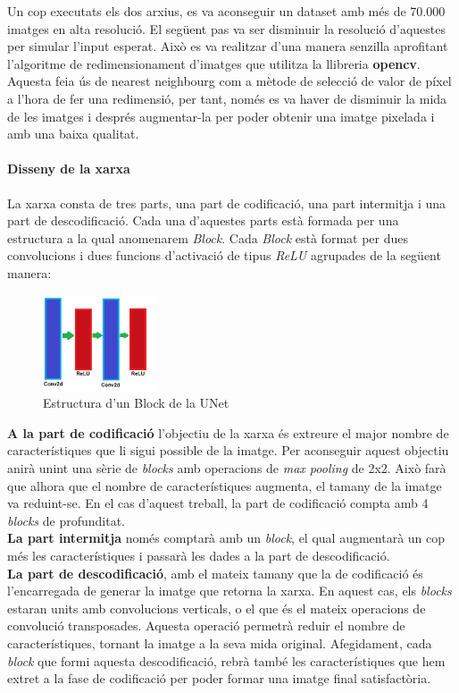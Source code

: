 ﻿\documentclass[10pt,a4paper,twocolumn,twoside]{article}
\begin{document}
Un cop executats els dos arxius, es va aconseguir un dataset amb més de 70.000 imatges en alta resolució. El següent pas va ser disminuir la resolució d'aquestes per simular l'input esperat. Això es va realitzar d'una manera senzilla aprofitant l'algoritme de redimensionament d'imatges que utilitza la llibreria \textbf{opencv}. Aquesta feia ús de nearest neighbourg com a mètode de selecció de valor de píxel a l'hora de fer una redimensió, per tant, només es va haver de disminuir la mida de les imatges i després augmentar-la per poder obtenir una imatge pixelada i amb una baixa qualitat.

\paragraph{Disseny de la xarxa}
La xarxa consta de tres parts, una part de codificació, una part intermitja i una part de descodificació. Cada una d'aquestes parts està formada per una estructura a la qual anomenarem \textit{Block}. Cada \textit{Block} està format per dues convolucions i dues funcions d'activació de tipus \textit{ReLU} agrupades de la següent manera:
\begin{figure}[H]
\centering
\includegraphics[width=0.3\textwidth]{img/graficaBlock.png}
\caption{Estructura d'un Block de la UNet}
\end{figure}

\textbf{A la part de codificació} l'objectiu de la xarxa és extreure el major nombre de característiques que li sigui possible de la imatge. Per aconseguir aquest objectiu anirà unint una sèrie de \textit{blocks} amb operacions de \textit{max pooling} de 2x2. Això farà que alhora que el nombre de característiques augmenta, el tamany de la imatge va reduint-se. En el cas d'aquest treball, la part de codificació compta amb 4 \textit{blocks} de profunditat.\\

\textbf{La part intermitja} només comptarà amb un \textit{block}, el qual augmentarà un cop més les característiques i passarà les dades a la part de descodificació.\\

\textbf{La part de descodificació}, amb el mateix tamany que la de codificació és l'encarregada de generar la imatge que retorna la xarxa. En aquest cas, els \textit{blocks} estaran units amb convolucions verticals, o el que és el mateix operacions de convolució transposades. Aquesta operació permetrà reduir el nombre de característiques, tornant la imatge a la seva mida original. Afegidament, cada \textit{block} que formi aquesta descodificació, rebrà també les característiques que hem extret a la fase de codificació per poder formar una imatge final satisfactòria.
\end{document}

